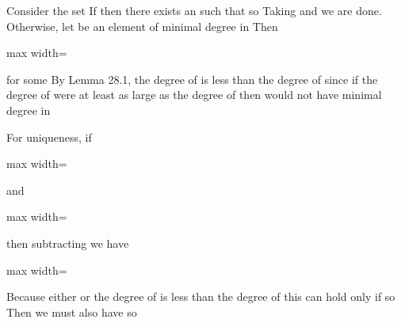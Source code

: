 \documentclass[11pt,oneside]{article}
\begin{document}
\begin{BookBody}

 Consider the set  If  then there exists an  such that  so  Taking  and  we are done. Otherwise, let  be an element of minimal degree in  Then

\begin{center}\begin{adjustbox}{max width=\linewidth}\end{adjustbox}\end{center}

\noindent for some  By Lemma 28.1, the degree of  is less than the degree of  since if the degree of  were at least as large as the degree of  then  would not have minimal degree in 

For uniqueness, if

\begin{center}\begin{adjustbox}{max width=\linewidth}\end{adjustbox}\end{center}

\noindent and

\begin{center}\begin{adjustbox}{max width=\linewidth}\end{adjustbox}\end{center}

\noindent then subtracting we have

\begin{center}\begin{adjustbox}{max width=\linewidth}\end{adjustbox}\end{center}

\noindent Because either  or the degree of  is less than the degree of  this can hold only if  so  Then we must also have  so \BookEnd{\blacklozenge}


\end{BookBody}
\end{document}
